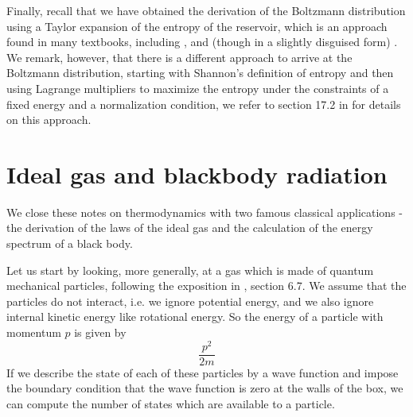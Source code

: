 \documentclass[a4paper, draft]{article}
\theoremstyle{own}
\theoremstyle{remark}
\begin{document}
Finally, recall that we have obtained the derivation of the Boltzmann distribution using a Taylor expansion of the entropy of the reservoir, which is an approach found in many textbooks, including \cite{Callen}, and (though in a slightly disguised form) \cite{Schroeder}. We remark, however, that there is a different approach to arrive at the Boltzmann distribution, starting with Shannon's definition of entropy and then using Lagrange multipliers to maximize the entropy under the constraints of a fixed energy and a normalization condition, we refer to section 17.2 in \cite{Callen} for details on this approach.

\section{Ideal gas and blackbody radiation}

We close these notes on thermodynamics with two famous classical applications - the derivation of the laws of the ideal gas and the calculation of the energy spectrum of a black body.

Let us start by looking, more generally, at a gas which is made of quantum mechanical particles, following the exposition in \cite{Schroeder}, section 6.7.  We assume that the particles do not interact, i.e. we ignore potential energy, and we also ignore internal kinetic energy like rotational energy. So the energy of a particle with momentum $p$ is given by
$$
\frac{p^2}{2m}
$$
If we describe the state of each of these particles by a wave function and impose the boundary condition that the wave function is zero at the walls of the box, we can compute the number of states which are available to a particle. 
\end{document}
